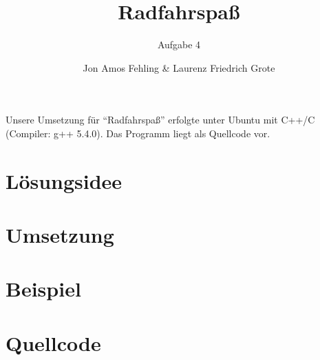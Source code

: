\documentclass[parskip=full, DIV=14]{scrartcl}
\begin{document}
	\pagestyle{scrheadings}


	\titlehead{Aufgabe 4: Radfahrspaß, Team 00001 \hfill Jon Fehling, Laurenz Grote}
	\title{Radfahrspaß}
	\subtitle{Aufgabe 4}
	\author{Jon Amos Fehling \& Laurenz Friedrich Grote}
	\date{}
	\maketitle
	\tableofcontents
	
	\vspace {2em}
	Unsere Umsetzung für "`Radfahrspaß"' erfolgte unter Ubuntu mit C++/C (Compiler: g++ 5.4.0). Das Programm liegt als Quellcode vor.
	\clearpage
	\section{Lösungsidee}
		
	\clearpage
	\section{Umsetzung}
		
	\clearpage
	\section{Beispiel}
		
	\clearpage
	\section{Quellcode}
		
\end{document}
